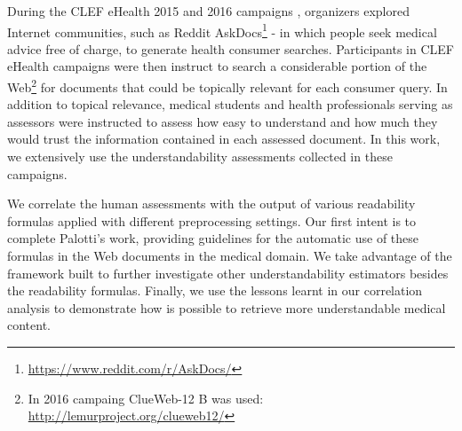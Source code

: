 \documentclass[runningheads,a4paper]{llncs}
\begin{document}
During the CLEF eHealth 2015 and 2016 campaigns \cite{clef15,clef16}, organizers explored Internet communities, such as Reddit AskDocs\footnote{\url{https://www.reddit.com/r/AskDocs/}} - in which people seek medical advice free of charge, to generate health consumer searches. Participants in CLEF eHealth campaigns were then instruct to search a considerable portion of the Web\footnote{In 2016 campaing ClueWeb-12 B was used: \url{http://lemurproject.org/clueweb12/}} for documents that could be topically relevant for each consumer query.
In addition to topical relevance, medical students and health professionals serving as assessors were instructed to assess how easy to understand and how much they would trust the information contained in each assessed document. %
%
In this work, we extensively use the understandability assessments collected in these campaigns.


We correlate the human assessments with the output of various readability formulas applied with different preprocessing settings.
Our first intent is to complete Palotti's work, providing guidelines for the automatic use of these formulas in the Web documents in the medical domain.
We take advantage of the framework built to further investigate other understandability estimators besides the readability formulas.
Finally, we use the lessons learnt in our correlation analysis to demonstrate how is possible to retrieve more understandable medical content. 
\end{document}
